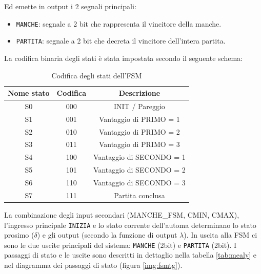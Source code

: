 \documentclass[a4paper]{report}
\begin{document}
Ed emette in output i 2 segnali principali:
\begin{itemize}
    \item \texttt{MANCHE}: segnale a 2 bit che rappresenta il vincitore della manche.
    \item \texttt{PARTITA}: segnale a 2 bit che decreta il vincitore dell'intera partita.
\end{itemize}

\vspace*{10pt}
\begin{center}
    La codifica binaria degli stati è stata impostata secondo il seguente schema:
        \begin{table}[h]
            \centering
        \renewcommand{\arraystretch}{1.4}
        \ttfamily

        \begin{tabular}{|c|c|c|}
        \hline
        \textbf{Nome stato} & \textbf{Codifica} & \textbf{Descrizione} \\
        \hline
        S0 & 000 & INIT / Pareggio  \\
        \hline
        S1 & 001 & Vantaggio di PRIMO = 1 \\
        \hline
        S2 & 010 & Vantaggio di PRIMO = 2 \\
        \hline
        S3 & 011 & Vantaggio di PRIMO = 3 \\
        \hline
        S4 & 100 & Vantaggio di SECONDO = 1 \\
        \hline
        S5 & 101 & Vantaggio di SECONDO = 2 \\
        \hline
        S6 & 110 & Vantaggio di SECONDO = 3 \\
        \hline
        S7 & 111 & Partita conclusa \\
        \hline
        \end{tabular}
        \caption{Codifica degli stati dell'FSM}
        \label{tab:codifica_stati}
        \end{table}
\end{center}

La combinazione degli input secondari (MANCHE\_FSM, CMIN, CMAX), l'ingresso principale \texttt{INIZIA} e lo stato corrente dell'automa determinano lo stato prosimo ($\delta$) e gli output (secondo la funzione di output $\lambda$).
In uscita alla FSM ci sono le due uscite principali del sistema: \texttt{MANCHE} (2bit) e \texttt{PARTITA} (2bit).
I passaggi di stato e le uscite sono descritti in dettaglio nella tabella \ref{tab:mealy} e nel diagramma dei passaggi di stato (figura \ref{img:fsmtg}).
\end{document}
